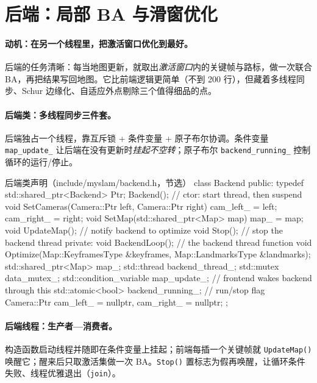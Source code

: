 \section{后端：局部 BA 与滑窗优化}
\label{sec:sys-backend}

\paragraph{动机：在另一个线程里，把激活窗口优化到最好。}
后端的任务清晰：每当地图更新，就取出\emph{激活窗口}内的关键帧与路标，做一次联合 BA，再把结果写回地图。它比前端逻辑更简单（不到 200 行），但藏着多线程同步、Schur 边缘化、自适应外点剔除三个值得细品的点。

\paragraph{后端类：多线程同步三件套。}
后端独占一个线程，靠互斥锁 + 条件变量 + 原子布尔协调。条件变量 \texttt{map\_update\_} 让后端在没有更新时\emph{挂起不空转}；原子布尔 \texttt{backend\_running\_} 控制循环的运行/停止。

\begin{codebox}[C++]{后端类声明（include/myslam/backend.h，节选）}
class Backend {
   public:
    typedef std::shared_ptr<Backend> Ptr;
    Backend();                                   // ctor: start thread, then suspend
    void SetCameras(Camera::Ptr left, Camera::Ptr right) { cam_left_ = left; cam_right_ = right; }
    void SetMap(std::shared_ptr<Map> map) { map_ = map; }
    void UpdateMap();                            // notify backend to optimize
    void Stop();                                 // stop the backend thread
   private:
    void BackendLoop();                          // the backend thread function
    void Optimize(Map::KeyframesType &keyframes, Map::LandmarksType &landmarks);
    std::shared_ptr<Map> map_;
    std::thread backend_thread_;
    std::mutex data_mutex_;
    std::condition_variable map_update_;         // frontend wakes backend through this
    std::atomic<bool> backend_running_;          // run/stop flag
    Camera::Ptr cam_left_ = nullptr, cam_right_ = nullptr;
};
\end{codebox}

\paragraph{后端线程：生产者—消费者。}
构造函数启动线程并随即在条件变量上挂起；前端每插一个关键帧就 \texttt{UpdateMap()} 唤醒它；醒来后只取激活集做一次 BA。\texttt{Stop()} 置标志为假再唤醒，让循环条件失败、线程优雅退出（\texttt{join}）。

